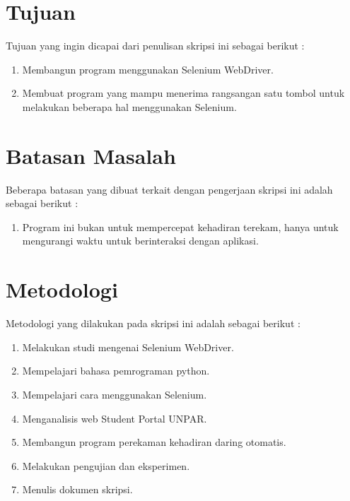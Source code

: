 \section{Tujuan}
\label{sec:tujuan}
Tujuan yang ingin dicapai dari penulisan skripsi ini sebagai berikut :
\begin{enumerate}
	\item Membangun program menggunakan Selenium WebDriver.
	\item Membuat program yang mampu menerima rangsangan satu tombol untuk melakukan beberapa hal menggunakan Selenium.
\end{enumerate}

\section{Batasan Masalah}
\label{sec:batasan}
Beberapa batasan yang dibuat terkait dengan pengerjaan skripsi ini adalah sebagai berikut :
\begin{enumerate}
	\item Program ini bukan untuk mempercepat kehadiran terekam, hanya untuk mengurangi waktu untuk berinteraksi dengan aplikasi.
\end{enumerate}


\section{Metodologi}
\label{sec:metlit}
Metodologi yang dilakukan pada skripsi ini adalah sebagai berikut :
\begin{enumerate}
	\item Melakukan studi mengenai Selenium WebDriver.
	\item Mempelajari bahasa pemrograman python.
	\item Mempelajari cara menggunakan Selenium.
	\item Menganalisis web Student Portal UNPAR.
	\item Membangun program perekaman kehadiran daring otomatis.
	\item Melakukan pengujian dan eksperimen.
	\item Menulis dokumen skripsi.		
\end{enumerate}


